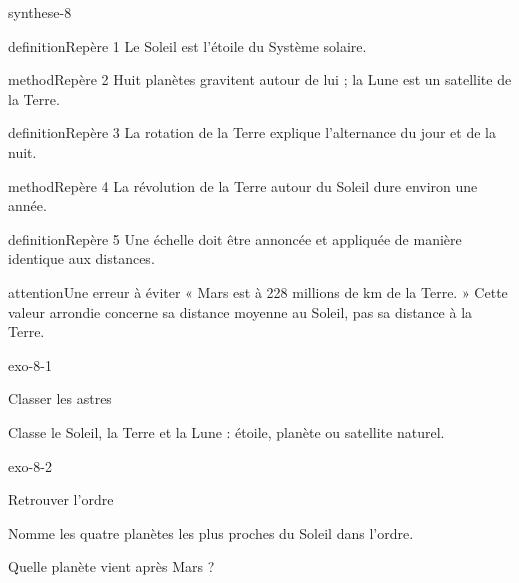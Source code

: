 \documentclass[12pt,twoside,openany]{book}
\begin{document}
\begin{pcFiche}{synthese-8}
\begin{pcEncadre}{definition}{Repère 1}
Le Soleil est l’étoile du Système solaire.\par
\end{pcEncadre}
\begin{pcEncadre}{method}{Repère 2}
Huit planètes gravitent autour de lui ; la Lune est un satellite de la Terre.\par
\end{pcEncadre}
\begin{pcEncadre}{definition}{Repère 3}
La rotation de la Terre explique l’alternance du jour et de la nuit.\par
\end{pcEncadre}
\begin{pcEncadre}{method}{Repère 4}
La révolution de la Terre autour du Soleil dure environ une année.\par
\end{pcEncadre}
\begin{pcEncadre}{definition}{Repère 5}
Une échelle doit être annoncée et appliquée de manière identique aux distances.\par
\end{pcEncadre}
\begin{pcEncadre}{attention}{Une erreur à éviter}
« Mars est à 228 millions de km de la Terre. » Cette valeur arrondie concerne sa distance moyenne au Soleil, pas sa distance à la Terre.\par
\end{pcEncadre}
\end{pcFiche}
\clearpage{}
\begin{blocLivre}{exo-8-1}
\begin{exercice}[1]{Classer les astres}
\begin{questions}
\item Classe le Soleil, la Terre et la Lune : étoile, planète ou satellite naturel.
\end{questions}
\end{exercice}\end{blocLivre}
\begin{blocLivre}{exo-8-2}
\begin{exercice}[1]{Retrouver l’ordre}
\begin{questions}
\item Nomme les quatre planètes les plus proches du Soleil dans l’ordre.
\item Quelle planète vient après Mars ?
\end{questions}
\end{exercice}\end{blocLivre}
\end{document}
